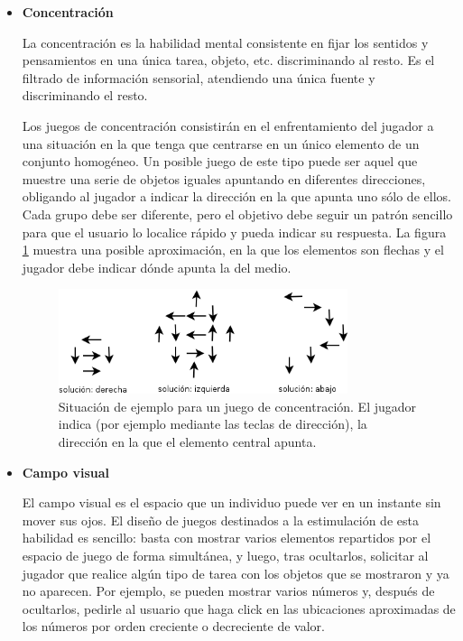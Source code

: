 \begin{itemize}

\item {\bf Concentración}

La concentración es la habilidad mental consistente en fijar los sentidos y pensamientos en una única tarea, objeto, etc. discriminando al resto. Es el filtrado de información sensorial, atendiendo una única fuente y discriminando el resto.

Los juegos de concentración consistirán en el enfrentamiento del jugador a una situación en la que tenga que centrarse en un único elemento de un conjunto homogéneo. Un posible juego de este tipo puede ser aquel que muestre una serie de objetos iguales apuntando en diferentes direcciones, obligando al jugador a indicar la dirección en la que apunta uno sólo de ellos. Cada grupo debe ser diferente, pero el objetivo debe seguir un patrón sencillo para que el usuario lo localice rápido y pueda indicar su respuesta. La figura \ref{fig::game-focus} muestra una posible aproximación, en la que los elementos son flechas y el jugador debe indicar dónde apunta la del medio.

\begin{figure}[h]
  \begin{center}
    \includegraphics[width=0.8\textwidth]{./images/game-focus.png}
    \caption[Juego de concentración]{Situación de ejemplo para un juego de concentración. El jugador indica (por ejemplo mediante las teclas de dirección), la dirección en la que el elemento central apunta.}
    \label{fig::game-focus}
  \end{center}  
\end{figure}

\item {\bf Campo visual}

El campo visual es el espacio que un individuo puede ver en un instante sin mover sus ojos. El diseño de juegos destinados a la estimulación de esta habilidad es sencillo: basta con mostrar varios elementos repartidos por el espacio de juego de forma simultánea, y luego, tras ocultarlos, solicitar al jugador que realice algún tipo de tarea con los objetos que se mostraron y ya no aparecen. Por ejemplo, se pueden mostrar varios números y, después de ocultarlos, pedirle al usuario que haga click en las ubicaciones aproximadas de los números por orden creciente o decreciente de valor.

\end{itemize}

